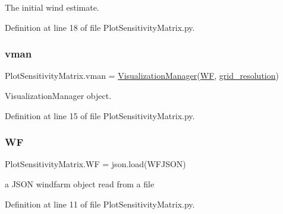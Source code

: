 The initial wind estimate. 



Definition at line 18 of file Plot\+Sensitivity\+Matrix.\+py.

\mbox{\label{namespace_plot_sensitivity_matrix_a561c3184abc48dd7ca3ac05112482a82}} 
\subsubsection{\texorpdfstring{vman}{vman}}
{\footnotesize\ttfamily Plot\+Sensitivity\+Matrix.\+vman = \mbox{\hyperlink{classvisualization__manager___d_j_1_1_visualization_manager}{Visualization\+Manager}}(\mbox{\hyperlink{namespace_plot_sensitivity_matrix_ab3a981e10a7fb62fd0803b775cfc9c6e}{WF}}, \mbox{\hyperlink{namespace_plot_sensitivity_matrix_acceedf9e01ea99cebd60321cfe5f1563}{grid\+\_\+resolution}})}



Visualization\+Manager object. 



Definition at line 15 of file Plot\+Sensitivity\+Matrix.\+py.

\mbox{\label{namespace_plot_sensitivity_matrix_ab3a981e10a7fb62fd0803b775cfc9c6e}} 
\subsubsection{\texorpdfstring{WF}{WF}}
{\footnotesize\ttfamily Plot\+Sensitivity\+Matrix.\+WF = json.\+load(W\+F\+J\+S\+ON)}



a J\+S\+ON windfarm object read from a file 



Definition at line 11 of file Plot\+Sensitivity\+Matrix.\+py.

